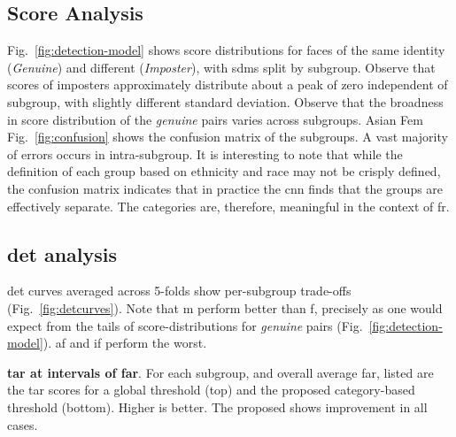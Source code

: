  





\subsection{Score Analysis}
Fig.~\ref{fig:detection-model} shows score distributions for faces of the same identity (\ie \emph{Genuine}) and different (\ie \emph{Imposter}), with \gls{sdm}s split by subgroup. Observe that scores of imposters  approximately distribute about a peak of zero independent of subgroup, with slightly different standard deviation. Observe that the broadness in score distribution of the \emph{genuine} pairs varies across subgroups. Asian Fem
Fig.~\ref{fig:confusion} shows the confusion matrix of the subgroups. A vast majority of errors occurs in intra-subgroup. It is interesting to note that while the definition of  each group  based on ethnicity and race may not be crisply defined, the confusion matrix indicates that in practice the \gls{cnn} finds that the groups are effectively separate. The categories are, therefore, meaningful in the context of \gls{fr}.


\subsection{\gls{det} analysis}

\gls{det} curves averaged across 5-folds show per-subgroup trade-offs (Fig.~\ref{fig:detcurves}). Note that \gls{m} perform better than \gls{f}, precisely as one would expect from the tails of score-distributions for \emph{genuine} pairs (Fig.~\ref{fig:detection-model}). \Gls{af} and \gls{if} perform the worst.


 
\begin{table}[t!]
\caption{\small{\textbf{\gls{tar} at intervals of \gls{far}}. For each subgroup, and overall average \gls{far}, listed are the \gls{tar} scores for a global threshold (top) and the proposed category-based threshold (bottom). Higher is better. The proposed shows improvement in all cases.}}\label{tab:ethnicy-far} 

\end{table}


